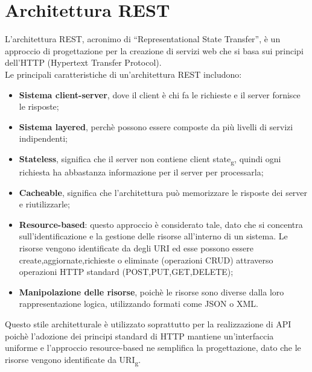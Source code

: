 \section{Architettura REST}
L’architettura REST, acronimo di “Representational State Transfer”, è un approccio di progettazione per la creazione di servizi web che si basa sui principi dell’HTTP (Hypertext Transfer Protocol).\\
Le principali caratteristiche di un’architettura REST includono:
\begin{itemize}
\item \textbf{Sistema client-server}, dove il client è chi fa le richieste e il server fornisce le risposte;
\item \textbf{Sistema layered}, perchè possono essere composte da più livelli di servizi indipendenti;
\item \textbf{Stateless}, significa che il server non contiene client state\textsubscript{g}, quindi ogni richiesta ha abbastanza informazione per il server per processarla;
\item \textbf{Cacheable}, significa che l’architettura può memorizzare le risposte dei server e riutilizzarle;
\item \textbf{Resource-based}: questo approccio è considerato tale, dato che si concentra sull’identificazione e la gestione delle risorse all’interno di un sistema. Le risorse vengono identificate da degli URI ed esse possono essere create,aggiornate,richieste o eliminate (operazioni CRUD) attraverso operazioni HTTP standard (POST,PUT,GET,DELETE);
\item \textbf{Manipolazione delle risorse}, poichè le risorse sono diverse dalla loro rappresentazione logica, utilizzando formati come JSON o XML.
\end{itemize}
Questo stile architetturale è utilizzato soprattutto per la realizzazione di API poichè l'adozione dei principi standard di HTTP mantiene un'interfaccia uniforme e l'approccio resource-based ne semplifica la progettazione, dato che le risorse vengono identificate da URI\textsubscript{g}.
